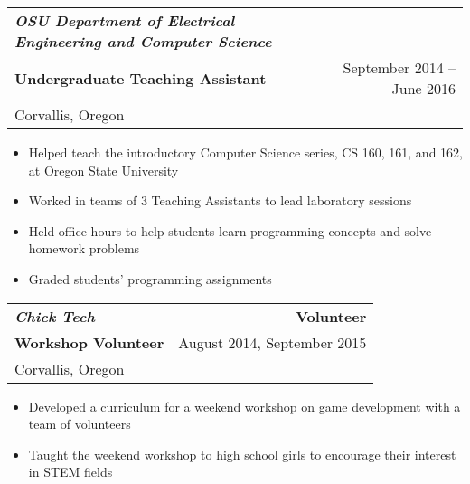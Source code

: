 \documentclass[letterpaper,10pt,titlepage]{article}
\begin{document}
\begin{tabularx}{\linewidth}{Xr}
\textbf{\textit{OSU Department of Electrical Engineering and Computer Science}} & \\
\textbf{Undergraduate Teaching Assistant}          & September 2014 -- June 2016\\
Corvallis, Oregon & \\
\end{tabularx}

\begin{itemize} \itemsep1pt \parskip0pt 
\item Helped teach the introductory Computer Science series, CS 160, 161, and 162, at Oregon State University
\item Worked in teams of 3 Teaching Assistants to lead laboratory sessions
\item Held office hours to help students learn programming concepts and solve homework problems
\item Graded students' programming assignments
\end{itemize}

\begin{tabularx}{\linewidth}{Xr}
\textbf{\textit{Chick Tech}}   & \textbf{Volunteer}\\
\textbf{Workshop Volunteer}    & August 2014, September 2015\\
Corvallis, Oregon & \\
\end{tabularx}

\begin{itemize} \itemsep1pt \parskip0pt 
\item Developed a curriculum for a weekend workshop on game development with a team of volunteers
\item Taught the weekend workshop to high school girls to encourage their interest in STEM fields
\end{itemize}

\begin{comment} %
\begin{tabularx}{\linewidth}{Xr}
\textbf{\textit{OSU CARVE Lab}} & \textbf{Volunteer}\\
\textbf{Simulation Developer}   & March 2014 -- September 2014\\
Corvallis, Oregon & \\
\end{tabularx}
\begin{itemize} \itemsep1pt \parskip0pt \parsep0pt
\item Worked with a team of psychologists to create virtually simulated testing environments for experiments
\item Designed, programmed, and debugged a testing environment to the standards of the experiment design
\item Created virtual testing environments using Python and the Vizard Virtual Reality libraries for Spectroscopic Head-Mounted Displays Simulations
\end{itemize}
\end{comment}
\end{document}
